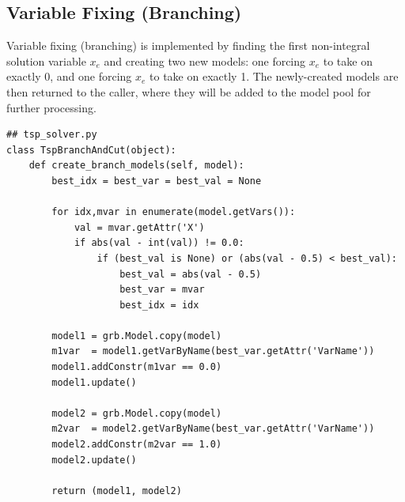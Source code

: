\documentclass{article}
\begin{document}
\subsection{Variable Fixing (Branching)}
\begin{flushleft}

Variable fixing (branching) is implemented
by finding the first non-integral solution variable $x_e$
and creating two new models:
one forcing $x_e$ to take on exactly 0,
and one forcing $x_e$ to take on exactly 1.
The newly-created models
are then returned to the caller,
where they will be added to the model pool
for further processing.

\begin{lstlisting}
## tsp_solver.py
class TspBranchAndCut(object):
    def create_branch_models(self, model):
        best_idx = best_var = best_val = None

        for idx,mvar in enumerate(model.getVars()):
            val = mvar.getAttr('X')
            if abs(val - int(val)) != 0.0:
                if (best_val is None) or (abs(val - 0.5) < best_val):
                    best_val = abs(val - 0.5)
                    best_var = mvar
                    best_idx = idx

        model1 = grb.Model.copy(model)
        m1var  = model1.getVarByName(best_var.getAttr('VarName'))
        model1.addConstr(m1var == 0.0)
        model1.update()

        model2 = grb.Model.copy(model)
        m2var  = model2.getVarByName(best_var.getAttr('VarName'))
        model2.addConstr(m2var == 1.0)
        model2.update()

        return (model1, model2)
\end{lstlisting}

\end{flushleft}
\end{document}
